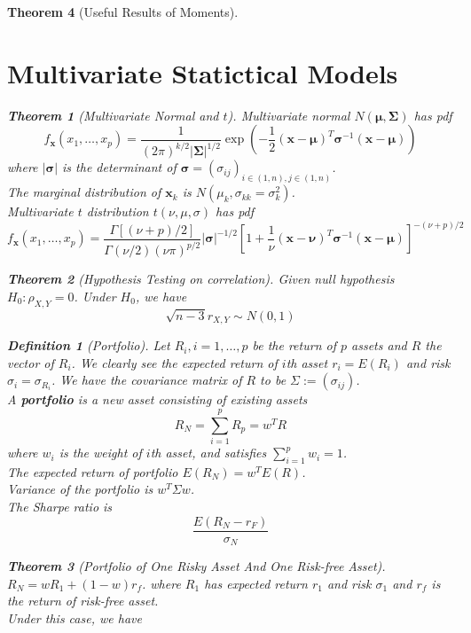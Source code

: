 \documentclass[11pt]{article}
\newtheorem{definition}{Definition}[section]
\newtheorem{theorem}{Theorem}[section]
\theoremstyle{definition}
\begin{document}
\begin{theorem}[Useful Results of Moments]
\section{Multivariate Statictical Models}
\begin{theorem}[Multivariate Normal and {$t$}]
\normalfont Multivariate normal $N(\mathbf{\mu}, \mathbf{\Sigma})$ has pdf
\[
f_{\mathbf{x}}(x_1,\ldots, x_p)=\frac{1}{(2\pi)^{k/2}|\mathbf{\Sigma}|^{1/2}}\exp(-\frac{1}{2}(\mathbf{x}-\mathbf{\mu})^T\mathbf{\sigma}^{-1}(\mathbf{x}-\mathbf{\mu}))
\]
where $|\mathbf{\sigma}|$ is the determinant of $\mathbf{\sigma}=(\sigma_{ij})_{i\in (1, n), j\in (1, n)}$.\\
The marginal distribution of $\mathbf{x}_k$ is $N(\mu_k,\sigma_{kk}=\sigma_k^2)$.\\
Multivariate $t$ distribution $t(\nu, \mu, \sigma)$ has pdf
\[
f_{\mathbf{x}}(x_1,\ldots, x_p)=\frac{\Gamma[(\nu + p)/2]}{\Gamma(\nu/2)(\nu\pi)^{p/2}}|\mathbf{\sigma}|^{-1/2}[1+\frac{1}{\nu}(\mathbf{x}-\mathbf{\nu})^T\mathbf{\sigma}^{-1}(\mathbf{x}-\mathbf{\mu})]^{-(\nu+p)/2}
\]
\end{theorem}
\begin{theorem}[Hypothesis Testing on correlation]
\normalfont Given null hypothesis $H_0:\rho_{X,Y}=0$. Under $H_0$, we have
\[
\sqrt{n-3}r_{X,Y}\sim N(0,1)
\]
\end{theorem}
\begin{definition}[Portfolio]
\normalfont Let $R_i, i = 1,\ldots, p$ be the return of $p$ assets and $R$ the vector of $R_i$. We clearly see the expected return of $i$th asset $r_i = E(R_i)$ and risk $\sigma_i = \sigma_{R_i}$.
We have the covariance matrix of $R$ to be $\Sigma:=(\sigma_{ij})$.\\
A \textbf{portfolio} is a new asset consisting of existing assets
\[
R_N=\sum_{i=1}^p R_p = w^TR
\]
where $w_i$ is the weight of $i$th asset, and satisfies $\sum_{i=1}^p w_i = 1$.\\
The expected return of portfolio $E(R_N)=w^TE(R)$.\\
Variance of the portfolio is $w^T\Sigma w$.\\
The Sharpe ratio is
\[
\frac{E(R_N-r_F)}{\sigma_N}
\]
\end{definition}
\begin{theorem}[Portfolio of One Risky Asset And One Risk-free Asset]
\normalfont $R_N=wR_1+(1-w)r_f$. where $R_1$ has expected return $r_1$ and risk $\sigma_1$ and $r_f$ is the return of risk-free asset.\\
Under this case, we have

\end{theorem}
\end{theorem}
\end{document}
